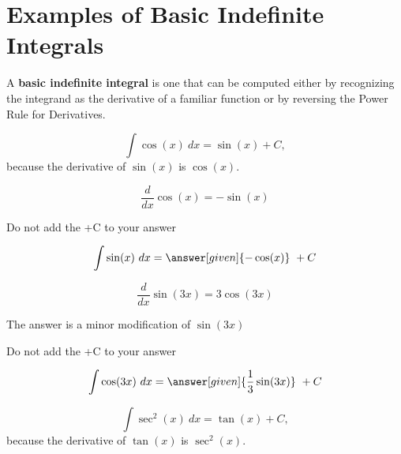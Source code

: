 \documentclass{ximera}
\begin{document}
\section{Examples of Basic Indefinite Integrals}

A \textbf{basic indefinite integral} is one that can be computed either by recognizing the integrand as the 
derivative of a familiar function or by reversing the Power Rule for Derivatives.



\begin{example} %
\[
\int \cos(x) \ dx = \sin(x) + C,
\]
because the derivative of $\sin(x)$ is $\cos(x)$.

\end{example}

\begin{problem} %

\begin{hint}
\[
\frac{d}{dx} \cos(x) = -\sin(x)
\]
\end{hint}
\begin{hint}
\begin{center}
Do not add the +C to your answer
\end{center}
\end{hint}

\[
\int \sin(x) \ dx =
\answer[given]{-\cos(x)} \ + C
\]
\end{problem}

\begin{problem} %

\begin{hint}
\[
\frac{d}{dx} \sin(3x) = 3\cos(3x)
\]
\end{hint}
\begin{hint}
The answer is a minor modification of $\sin(3x)$
\end{hint}
\begin{hint}
\begin{center}
Do not add the +C to your answer
\end{center}
\end{hint}

\[
\int \cos(3x) \ dx =
\answer[given]{\frac13 \sin(3x)} \ + C
\]
\end{problem}

\begin{example} %
\[
\int \sec^2(x) \ dx = \tan(x) + C,
\]
because the derivative of $\tan(x)$ is $\sec^2(x)$.

\end{example}
\end{document}
